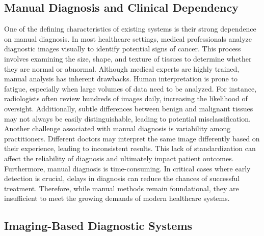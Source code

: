 \documentclass[a4paper,12pt]{report}
\begin{document}
\begin{doublespace}
\subsection{Manual Diagnosis and Clinical Dependency}
\label{subsection:2.2}
One of the defining characteristics of existing systems is their strong dependence on manual diagnosis. In most healthcare settings, medical professionals analyze diagnostic images visually to identify potential signs of cancer. This process involves examining the size, shape, and texture of tissues to determine whether they are normal or abnormal.
Although medical experts are highly trained, manual analysis has inherent drawbacks. Human interpretation is prone to fatigue, especially when large volumes of data need to be analyzed. For instance, radiologists often review hundreds of images daily, increasing the likelihood of oversight. Additionally, subtle differences between benign and malignant tissues may not always be easily distinguishable, leading to potential misclassification.
Another challenge associated with manual diagnosis is variability among practitioners. Different doctors may interpret the same image differently based on their experience, leading to inconsistent results. This lack of standardization can affect the reliability of diagnosis and ultimately impact patient outcomes.
Furthermore, manual diagnosis is time-consuming. In critical cases where early detection is crucial, delays in diagnosis can reduce the chances of successful treatment. Therefore, while manual methods remain foundational, they are insufficient to meet the growing demands of modern healthcare systems.


\subsection{Imaging-Based Diagnostic Systems}
\label{sec:2.3}


\end{doublespace}
\end{document}
